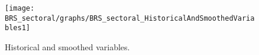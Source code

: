  
\begin{figure}[H]
\centering 
\texttt{[image: BRS\_sectoral/graphs/BRS\_sectoral\_HistoricalAndSmoothedVariables1]}
\caption{Historical and smoothed variables.}\label{Fig:HistoricalAndSmoothedVariables:1}
\end{figure}


